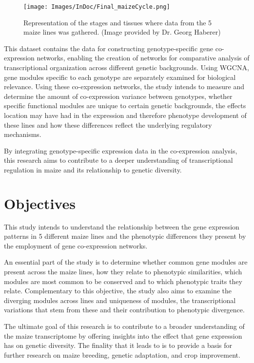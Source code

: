 \documentclass[
]{article}
\begin{document}
\begin{figure}[H]
  \centering
  \texttt{[image: Images/InDoc/Final\_maizeCycle.png]}
  \caption[Maize Cycle]{\small Representation of the stages and tissues where data from the 5 maize lines was gathered. (Image provided by Dr. Georg Haberer)}
    \label{fig:maize_cycle}
\end{figure}

This dataset contains the data for constructing genotype-specific gene
co-expression networks, enabling the creation of networks for
comparative analysis of transcriptional organization across different
genetic backgrounds. Using WGCNA, gene modules specific to each genotype
are separately examined for biological relevance. Using these
co-expression networks, the study intends to measure and determine the
amount of co-expression variance between genotypes, whether specific
functional modules are unique to certain genetic backgrounds, the
effects location may have had in the expression and therefore phenotype
development of these lines and how these differences reflect the
underlying regulatory mechanisms.

By integrating genotype-specific expression data in the co-expression
analysis, this research aims to contribute to a deeper understanding of
transcriptional regulation in maize and its relationship to genetic
diversity.

\hypertarget{objectives}{%
\section{Objectives}\label{objectives}}

This study intends to understand the relationship between the gene
expression patterns in 5 different maize lines and the phenotypic
differences they present by the employment of gene co-expression
networks.

An essential part of the study is to determine whether common gene
modules are present across the maize lines, how they relate to
phenotypic similarities, which modules are most common to be conserved
and to which phenotypic traits they relate. Complementary to this
objective, the study also aims to examine the diverging modules across
lines and uniqueness of modules, the transcriptional variations that
stem from these and their contribution to phenotypic divergence.

The ultimate goal of this research is to contribute to a broader
understanding of the maize transcriptome by offering insights into the
effect that gene expression has on genetic diversity. The finality that
it leads to is to provide a basis for further research on maize
breeding, genetic adaptation, and crop improvement.
\end{document}
